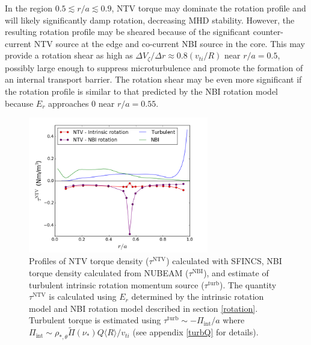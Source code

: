 \documentclass[aip, pop, preprint]{revtex4-1}
\numberwithin{figure}{section}
\numberwithin{equation}{section}
\begin{document}
In the region $0.5 \lesssim r/a \lesssim 0.9$, NTV torque may dominate the rotation profile and will likely significantly damp rotation, decreasing MHD stability. However, the resulting rotation profile may be sheared because of the significant counter-current NTV source at the edge and co-current NBI source in the core. This may provide a rotation shear as high as $\Delta V_{\zeta}/ \Delta r \approx 0.8 (v_{ti}/R)$ near $r/a = 0.5$, possibly large enough to suppress microturbulence\cite{Hahm1994} and promote the formation of an internal transport barrier. The rotation shear may be even more significant if the rotation profile is similar to that predicted by the NBI rotation model because $E_r$ approaches 0 near $r/a = 0.55$. 
\begin{figure}[h!]
\centering
\includegraphics[width=0.7\textwidth]{AllTorquePlot.png}
\caption{\label{fig:alltorque} Profiles of NTV torque density ($\tau^{\text{NTV}}$) calculated with SFINCS, NBI torque density calculated from NUBEAM ($\tau^{\text{NBI}}$), and estimate of turbulent intrinsic rotation momentum source ($\tau^{\text{turb}}$). The quantity $\tau^{\text{NTV}}$ is calculated using $E_r$ determined by the intrinsic rotation model and NBI rotation model described in section \ref{rotation}. Turbulent torque is estimated using $\tau^{\text{turb}} \sim -\Pi_{\text{int}}/a$ where $\Pi_{\text{int}} \sim \rho_{*, \theta} \widetilde{\Pi}(\nu_*) Q \langle R \rangle/v_{ti}$ (see appendix \ref{turbQ} for details).}
\end{figure}

\FloatBarrier
\end{document}
